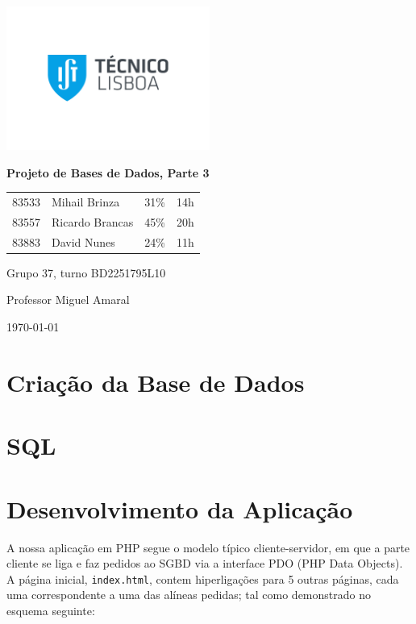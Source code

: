 \documentclass[a4paper]{article}
\begin{document}
    \begin{titlepage}
        \centering
        \includegraphics[width=0.5\textwidth]{IST_A_CMYK_POS.pdf}\par
        {\huge\bfseries Projeto de Bases de Dados, Parte 3\par}
        \vspace{2cm}
        {
        \Large
        \begin{tabular}{llll}
            83533 & Mihail Brinza & 31\% & 14h \\
            83557 & Ricardo Brancas & 45\% & 20h \\
            83883 & David Nunes & 24\% & 11h
        \end{tabular}
        }
        \vfill
        \large
        Grupo 37, turno BD2251795L10 \par
        Professor Miguel Amaral

        \vspace{3cm}

        {\normalsize \today\par}
    \end{titlepage}

    \section{Criação da Base de Dados}
    

    \section{SQL}
    

    \section{Desenvolvimento da Aplicação}
    A nossa aplicação em PHP segue o modelo típico cliente-servidor, em que a parte cliente se liga e faz pedidos ao SGBD
    via a interface PDO (PHP Data Objects).
    A página inicial, \texttt{index.html}, contem hiperligações para 5 outras páginas, cada uma correspondente
    a uma das alíneas pedidas; tal como demonstrado no esquema seguinte:
\end{document}
